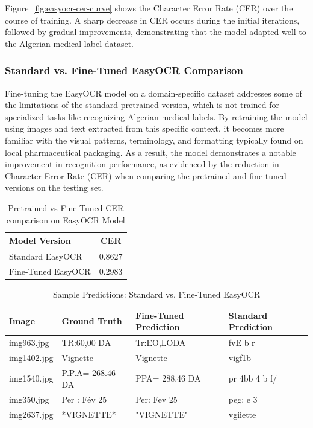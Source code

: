 Figure~\ref{fig:easyocr-cer-curve} shows the Character Error Rate (CER) over the course of training. A sharp decrease in CER occurs during the initial iterations, followed by gradual improvements, demonstrating that the model adapted well to the Algerian medical label dataset.

\subsubsection{Standard vs. Fine-Tuned EasyOCR Comparison}

Fine-tuning the EasyOCR model on a domain-specific dataset addresses some of the limitations of the standard pretrained version, which is not trained for specialized tasks like recognizing Algerian medical labels. By retraining the model using images and text extracted from this specific context, it becomes more familiar with the visual patterns, terminology, and formatting typically found on local pharmaceutical packaging. As a result, the model demonstrates a notable improvement in recognition performance, as evidenced by the reduction in Character Error Rate (CER) when comparing the pretrained and fine-tuned versions on the testing set.

\vspace{0.5cm}
\begin{table}[H]
\caption{Pretrained vs Fine-Tuned CER comparison on EasyOCR Model}
\centering
\begin{tabular}{lc}
\hline
\textbf{Model Version} & \textbf{CER} \\
\hline
Standard EasyOCR & 0.8627 \\
Fine-Tuned EasyOCR & 0.2983 \\
\hline
\end{tabular}

\label{tab:easyocr-cer-comparison}
\end{table}

\vspace{0.5cm}
\begin{table}[H]
\caption{Sample Predictions: Standard vs. Fine-Tuned EasyOCR}
\centering
\begin{tabular}{llll}
\hline
\textbf{Image} & \textbf{Ground Truth} & \textbf{Fine-Tuned Prediction} & \textbf{Standard Prediction} \\
\hline
img963.jpg & TR:60,00 DA & Tr:EO,LODA & fvE b r \\
img1402.jpg & Vignette & Vignette & vigf1b \\
img1540.jpg & P.P.A= 268.46 DA & PPA= 288.46 DA & pr 4bb 4 b f/ \\
img350.jpg & Per : Fév 25 & Per: Fev 25 & peg: e 3 \\
img2637.jpg & *VIGNETTE* & "VIGNETTE" & vgiiette \\
\hline
\end{tabular}

\label{tab:easyocr-sample-predictions}
\end{table}

